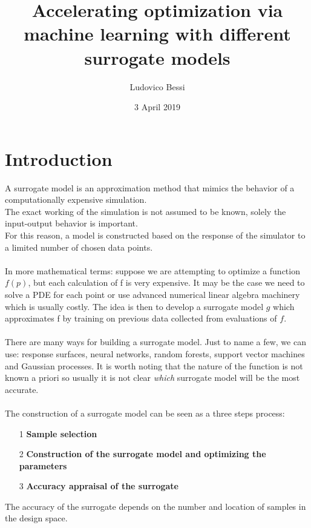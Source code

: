 \documentclass[11pt,a4paper,oneside,titlepage,openright]{book}
\begin{document}
 
\title{Accelerating optimization via machine learning with different surrogate models}
\author{Ludovico Bessi}

\date{3 April 2019}
\maketitle



\chapter*{Introduction}
A surrogate model is an approximation method that mimics the behavior of a computationally expensive simulation.\\
The exact working of the simulation is not assumed to be known, solely the input-output behavior is important. \\
For this reason, a model is constructed based on the response of the simulator to a limited number of chosen data points.\\\\
In more mathematical terms: suppose we are attempting to optimize a function $f(p)$, but each calculation of f is very expensive. It may be the case we need to solve a PDE for each point or use advanced numerical linear algebra machinery which is usually costly. 
The idea is then to develop a surrogate model $g$ which approximates f by training on previous data collected from evaluations of $f$.\\\\
There are many ways for building a surrogate model. Just to name a few, we can use: response surfaces, neural networks, random forests, support vector machines and Gaussian processes. It is worth noting that the nature of the function is not known a priori so usually it  is not clear \textit{which} surrogate model will be the most accurate.\\\\
The construction of a surrogate model can be seen as a three steps process:
\begin{itemize}
\item[1]\textbf{Sample selection}
\item[2]\textbf{Construction of the surrogate model and optimizing the parameters}
\item[3]\textbf{Accuracy appraisal of the surrogate}
\end{itemize}
The accuracy of the surrogate depends on the number and location of samples in the design space. 
\newpage
\end{document}
